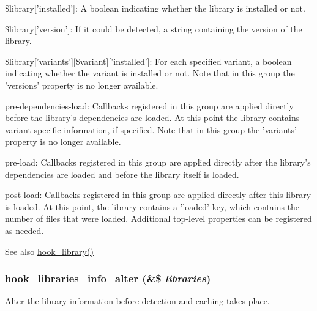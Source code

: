 \begin{DoxyItemize}
\begin{DoxyItemize}
\begin{DoxyItemize}
\item \$library\mbox{[}'installed'\mbox{]}: A boolean indicating whether the library is installed or not.
\item \$library\mbox{[}'version'\mbox{]}: If it could be detected, a string containing the version of the library.
\item \$library\mbox{[}'variants'\mbox{]}\mbox{[}\$variant\mbox{]}\mbox{[}'installed'\mbox{]}: For each specified variant, a boolean indicating whether the variant is installed or not. Note that in this group the 'versions' property is no longer available.
\end{DoxyItemize}
\item pre-\/dependencies-\/load: Callbacks registered in this group are applied directly before the library's dependencies are loaded. At this point the library contains variant-\/specific information, if specified. Note that in this group the 'variants' property is no longer available.
\item pre-\/load: Callbacks registered in this group are applied directly after the library's dependencies are loaded and before the library itself is loaded.
\item post-\/load: Callbacks registered in this group are applied directly after this library is loaded. At this point, the library contains a 'loaded' key, which contains the number of files that were loaded. Additional top-\/level properties can be registered as needed.
\end{DoxyItemize}
\end{DoxyItemize}

\begin{DoxySeeAlso}{See also}
\hyperlink{group__hooks_ga6bf3f83fa2e373836f5aa78fd143d1cd}{hook\_\-library()} 
\end{DoxySeeAlso}
\hypertarget{libraries_8api_8php_a6143e19206c3ddd8b4241306edf201a1}{
\subsubsection[{hook\_\-libraries\_\-info\_\-alter}]{\setlength{\rightskip}{0pt plus 5cm}hook\_\-libraries\_\-info\_\-alter (\&\$ {\em libraries})}}
\label{libraries_8api_8php_a6143e19206c3ddd8b4241306edf201a1}
Alter the library information before detection and caching takes place.


